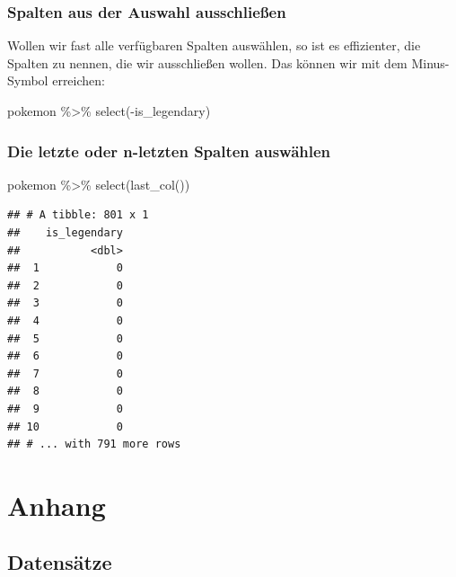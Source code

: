 \documentclass[
]{book}
\newenvironment{Shaded}{\begin{snugshade}}{\end{snugshade}}
\newcommand{\FunctionTok}[1]{\textcolor[rgb]{0.00,0.00,0.00}{#1}}
\newcommand{\NormalTok}[1]{#1}
\newcommand{\SpecialCharTok}[1]{\textcolor[rgb]{0.00,0.00,0.00}{#1}}
\begin{document}
\hypertarget{spalten-aus-der-auswahl-ausschlieuxdfen}{%
\section{Spalten aus der Auswahl ausschließen}\label{spalten-aus-der-auswahl-ausschlieuxdfen}}

Wollen wir fast alle verfügbaren Spalten auswählen, so ist es effizienter, die Spalten zu nennen, die wir ausschließen wollen. Das können wir mit dem Minus-Symbol erreichen:

\begin{Shaded}
\begin{Highlighting}[]
\NormalTok{pokemon }\SpecialCharTok{\%\textgreater{}\%}
  \FunctionTok{select}\NormalTok{(}\SpecialCharTok{{-}}\NormalTok{is\_legendary)}
\end{Highlighting}
\end{Shaded}

\hypertarget{die-letzte-oder-n-letzten-spalten-auswuxe4hlen}{%
\section{Die letzte oder n-letzten Spalten auswählen}\label{die-letzte-oder-n-letzten-spalten-auswuxe4hlen}}

\begin{Shaded}
\begin{Highlighting}[]
\NormalTok{pokemon }\SpecialCharTok{\%\textgreater{}\%}
  \FunctionTok{select}\NormalTok{(}\FunctionTok{last\_col}\NormalTok{())}
\end{Highlighting}
\end{Shaded}

\begin{verbatim}
## # A tibble: 801 x 1
##    is_legendary
##           <dbl>
##  1            0
##  2            0
##  3            0
##  4            0
##  5            0
##  6            0
##  7            0
##  8            0
##  9            0
## 10            0
## # ... with 791 more rows
\end{verbatim}

\hypertarget{part-anhang}{%
\part*{Anhang}\label{part-anhang}}

\hypertarget{datensaetze}{%
\chapter*{Datensätze}\label{datensaetze}}
\end{document}
